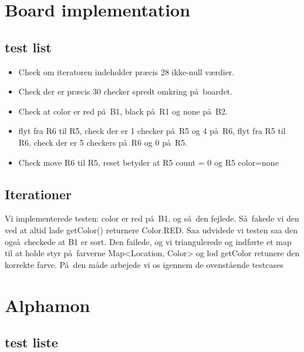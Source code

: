 \documentclass[a4paper]{article}
\begin{document}
\section{Board implementation}
\subsection{test list}
\begin{itemize}
\item Check om iteratoren indeholder pr\ae cis 28 ikke-null v\ae rdier.
\item Check der er pr\ae cis 30 checker spredt omkring p\aa\ boardet.
\item Check at color er red p\aa\ B1, black p\aa\ R1 og none p\aa\ B2.
\item flyt fra R6 til R5, check der er 1 checker p\aa\ R5 og 4 p\aa\ R6,
flyt fra R5 til R6, check der er 5 checkers p\aa\ R6 og 0 p\aa\ R5.

\item Check move R6 til R5, reset betyder at R5 count = 0 og R5 color=none
\end{itemize}

\subsection{Iterationer}

Vi implementerede testen: color er red p\aa\ B1, og s\aa\ den fejlede.
S\aa\ fakede vi den ved at altid lade getColor() returnere Color.RED.
Saa udvidede vi testen saa den ogs\aa\ checkede at B1 er sort.
Den failede, og vi triangulerede og indførte et map til at holde styr
p\aa\ farverne Map<Location, Color> og lod getColor retunere den korrekte
farve.
P\aa\ den m\aa de arbejede vi os igennem de ovenst\aa ende testcases



\section{Alphamon}

\subsection{test liste}
\end{document}
